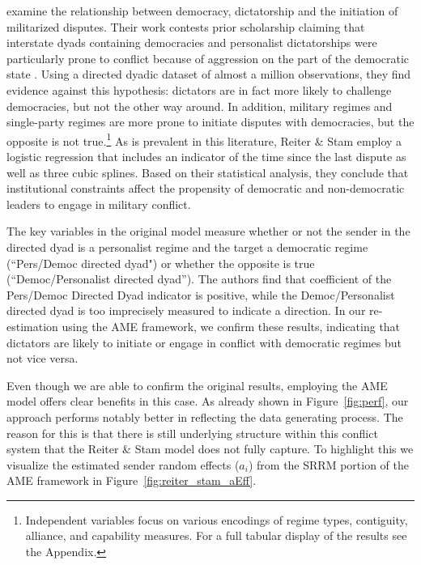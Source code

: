 \citet{reiter:stam:2003} examine the relationship between democracy, dictatorship and the initiation of militarized disputes. Their work contests prior scholarship claiming that interstate dyads containing democracies and personalist dictatorships were particularly prone to conflict because of aggression on the part of the democratic state \citep{peceny:etal:2002}. Using a directed dyadic dataset of almost a million observations, they find evidence against this hypothesis: dictators are in fact more likely to challenge democracies, but not the other way around. In addition, military regimes and single-party regimes are more prone to initiate disputes with democracies, but the opposite is not true.\footnote{Independent variables focus on various encodings of regime types, contiguity, alliance, and capability measures. For a full tabular display of the results see the Appendix.} As is prevalent in this literature, Reiter \& Stam employ a logistic regression that includes an indicator of the time since the last dispute as well as three cubic splines. Based on their statistical analysis, they conclude that institutional constraints affect the propensity of democratic and non-democratic leaders to engage in military conflict. 

The key variables in the original model measure whether or not the sender in the directed dyad is a personalist regime and the target a democratic regime (``Pers/Democ directed dyad") or whether the opposite is true (``Democ/Personalist directed dyad''). The authors find that coefficient of the Pers/Democ Directed Dyad indicator is positive, while the Democ/Personalist directed dyad is too imprecisely measured to indicate a direction. In our re-estimation using the AME framework, we confirm these results, indicating that dictators are likely to initiate or engage in conflict with democratic regimes but not vice versa. 

Even though we are able to confirm the original results, employing the AME model offers clear benefits in this case. As already shown in Figure~\ref{fig:perf}, our approach performs notably better in reflecting the data generating process. The reason for this is that there is still underlying structure within this conflict system that the Reiter \& Stam model does not fully capture. To highlight this we visualize the estimated sender random effects ($a_{i}$) from the SRRM portion of the AME framework in Figure~\ref{fig:reiter_stam_aEff}. 

